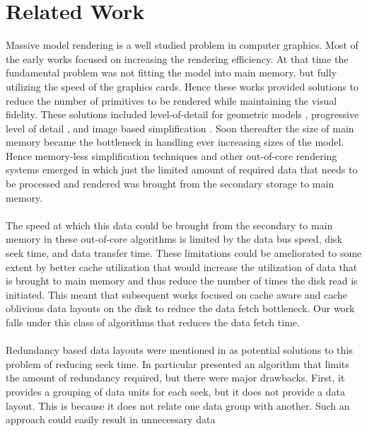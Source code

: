\section{Related Work}

Massive model rendering is a well studied problem in computer graphics. Most of
the early works focused on increasing the rendering efficiency. At that time
the fundamental problem was not fitting the model into main memory, but
fully utilizing the speed of the graphics cards. Hence these works provided
solutions to reduce the number of primitives to be rendered while maintaining
the visual fidelity. These solutions included level-of-detail for geometric
models \cite{Luebke02}, progressive level of detail
\cite{Hoppe:98b,Hoppe:97,Hoppe:96,SG:01}, and image based simplification
\cite{ACWBZEHHSBWBM:99}. Soon thereafter the size of main memory became the
bottleneck in handling ever increasing sizes of the model. Hence memory-less
simplification techniques \cite{LT:99}  and other out-of-core rendering systems
\cite{Silva02,VM:02} emerged in which just the limited amount of required data
that needs to be processed and rendered was brought from the secondary storage
to main memory. \\
\\
The speed at which this data
could be brought from the secondary to main memory in these out-of-core
algorithms is limited by the data bus speed, disk seek time, and data transfer
time. These limitations could be ameliorated to some extent by
better cache utilization that would increase the utilization of data that is
brought to main memory and thus reduce the number of times the disk read is
initiated. This meant that subsequent works focused on cache aware
\cite{ssdpaper} and cache oblivious data layouts
\cite{cacheobliviouslayout,YOON:2006:MeshLayout} on the disk to reduce the
data fetch bottleneck. Our work falls under this class of algorithms that
reduces the data fetch time. \\
\\
Redundancy based data layouts were mentioned in
\cite{Patterson88,singleseeklayout,optimizingredundancy} as potential solutions
to this problem of reducing seek time. In particular
\cite{optimizingredundancy} presented an algorithm that limits the amount of
redundancy required, but there were major drawbacks. First, it provides a
grouping of data units for each seek, but it does not provide a data layout.
This is because it does not relate one data group with another.
Such an approach could easily result in unnecessary data
